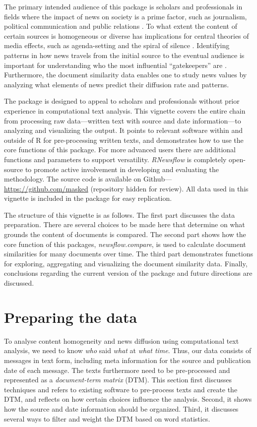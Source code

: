 The primary intended audience of this package is scholars and
professionals in fields where the impact of news on society is a prime
factor, such as journalism, political communication and public relations
\citep{baum08,boczkowski07,ragas14}. To what extent the content of
certain sources is homogeneous or diverse has implications for central
theories of media effects, such as agenda-setting and the spiral of
silence \citep{bennett08,blumler99}. Identifying patterns in how news
travels from the initial source to the eventual audience is important
for understanding who the most influential ``gatekeepers'' are
\citep{shoemaker09}. Furthermore, the document similarity data enables
one to study news values \citep{galtung65} by analyzing what elements of
news predict their diffusion rate and patterns.

The package is designed to appeal to scholars and professionals without
prior experience in computational text analysis. This vignette covers
the entire chain from processing raw data---written text with source and
date information---to analyzing and visualizing the output. It points to
relevant software within and outside of R for pre-processing written
texts, and demonstrates how to use the core functions of this package.
For more advanced users there are additional functions and parameters to
support versatility. \emph{RNewsflow} is completely open-source to
promote active involvement in developing and evaluating the methodology.
The source code is available on Github---\url{https://github.com/masked}
(repository hidden for review). All data used in this vignette is
included in the package for easy replication.

The structure of this vignette is as follows. The first part discusses
the data preparation. There are several choices to be made here that
determine on what grounds the content of documents is compared. The
second part shows how the core function of this packages,
\emph{newsflow.compare}, is used to calculate document similarities for
many documents over time. The third part demonstrates functions for
exploring, aggregating and visualizing the document similarity data.
Finally, conclusions regarding the current version of the package and
future directions are discussed.

\section{Preparing the data}

To analyse content homogeneity and news diffusion using computational
text analysis, we need to know \emph{who} said \emph{what} at
\emph{what time}. Thus, our data consists of messages in text form,
including meta information for the source and publication date of each
message. The texts furthermore need to be pre-processed and represented
as a \emph{document-term matrix} (DTM). This section first discusses
techniques and refers to existing software to pre-process texts and
create the DTM, and reflects on how certain choices influence the
analysis. Second, it shows how the source and date information should be
organized. Third, it discusses several ways to filter and weight the DTM
based on word statistics.

